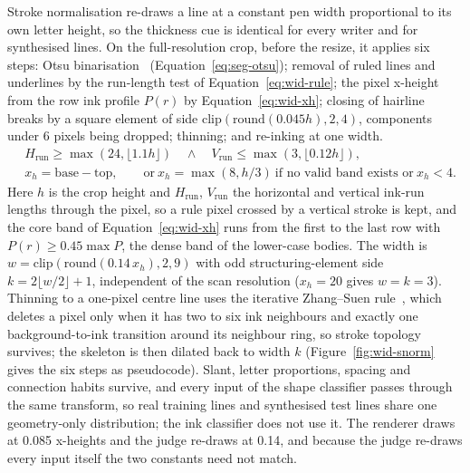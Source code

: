 Stroke normalisation re-draws a line at a constant pen width proportional to its own letter height, so the thickness cue is identical for every writer and for synthesised lines.
On the full-resolution crop, before the resize, it applies six steps: Otsu binarisation~\cite{otsu1979} (Equation~\ref{eq:seg-otsu}); removal of ruled lines and underlines by the run-length test of Equation~\ref{eq:wid-rule}; the pixel x-height from the row ink profile $P(r)$ by Equation~\ref{eq:wid-xh}; closing of hairline breaks by a square element of side $\mathrm{clip}(\mathrm{round}(0.045h),2,4)$, components under 6 pixels being dropped; thinning; and re-inking at one width.
\begin{align}
&H_{\mathrm{run}}\ge\max(24,\lfloor1.1h\rfloor)\quad\wedge\quad V_{\mathrm{run}}\le\max(3,\lfloor0.12h\rfloor),\label{eq:wid-rule}\\
&x_h=\text{base}-\text{top},\qquad\text{or}\ x_h=\max(8,h/3)\ \text{if no valid band exists or}\ x_h<4 .\label{eq:wid-xh}
\end{align}
Here $h$ is the crop height and $H_{\mathrm{run}}$, $V_{\mathrm{run}}$ the horizontal and vertical ink-run lengths through the pixel, so a rule pixel crossed by a vertical stroke is kept, and the core band of Equation~\ref{eq:wid-xh} runs from the first to the last row with $P(r)\ge0.45\max P$, the dense band of the lower-case bodies.
The width is $w=\mathrm{clip}(\mathrm{round}(0.14\,x_h),2,9)$ with odd structuring-element side $k=2\lfloor w/2\rfloor+1$, independent of the scan resolution ($x_h=20$ gives $w=k=3$).
Thinning to a one-pixel centre line uses the iterative Zhang--Suen rule~\cite{zhang1984}, which deletes a pixel only when it has two to six ink neighbours and exactly one background-to-ink transition around its neighbour ring, so stroke topology survives; the skeleton is then dilated back to width $k$ (Figure~\ref{fig:wid-snorm} gives the six steps as pseudocode).
Slant, letter proportions, spacing and connection habits survive, and every input of the shape classifier passes through the same transform, so real training lines and synthesised test lines share one geometry-only distribution; the ink classifier does not use it.
The renderer draws at 0.085 x-heights and the judge re-draws at 0.14, and because the judge re-draws every input itself the two constants need not match.



